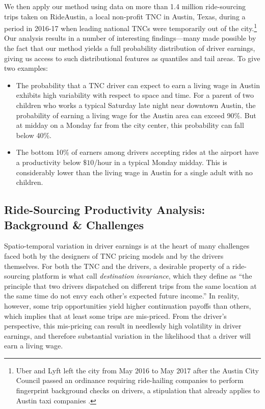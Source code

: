 \documentclass[a4paper, 11pt]{article}
\begin{document}
We then apply our method using data on more than 1.4 million ride-sourcing trips taken on RideAustin, a local non-profit TNC in Austin, Texas, during a period in 2016-17 when leading national TNCs were temporarily out of the city.\footnote{Uber and Lyft left the city from May 2016 to May 2017 after the Austin City Council passed an ordinance requiring ride-hailing companies to perform fingerprint background checks on drivers, a stipulation that already applies to Austin taxi companies \citep{samuels-2017}.}  Our analysis results in a number of interesting findings---many made possible by the fact that our method yields a full probability distribution of driver earnings, giving us access to such distributional features as quantiles and tail areas.  To give two examples:
\begin{itemize}[itemsep=0pt, partopsep=0pt]
    \item The probability that a TNC driver can expect to earn a living wage in Austin \citep[which we get from][]{nadeau-2017} exhibits high variability with respect to space and time. For a parent of two children who works a typical Saturday late night near downtown Austin, the probability of earning a living wage for the Austin area can exceed 90\%.  But at midday on a Monday far from the city center, this probability can fall below 40\%.
    \item The bottom 10\% of earners among drivers accepting rides at the airport have a productivity below $\$10$/hour in a typical Monday midday.  This is considerably lower than the living wage in Austin for a single adult with no children.
\end{itemize}



\subsection{Ride-Sourcing Productivity Analysis: Background \& Challenges}
\label{subsection:challenges}

Spatio-temporal variation in driver earnings is at the heart of many challenges faced both by the designers of TNC pricing models and by the drivers themselves.  For both the TNC and the drivers, a desirable property of a ride-sourcing platform is what \cite{zuniga-etal-2019} call \emph{destination invariance}, which they define as ``the principle that two drivers dispatched on different trips from the same location at the same time do not envy each other’s expected future income.''  In reality, however, some trip opportunities yield higher continuation payoffs than others, which implies that at least some trips are mis-priced.  From the driver's perspective, this mis-pricing can result in needlessly high volatility in driver earnings, and therefore substantial variation in the likelihood that a driver will earn a living wage.  
\end{document}
